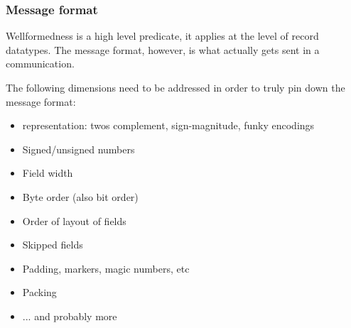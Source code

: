 \documentclass{beamer}
\begin{document}
\begin{frame}\frametitle{Message format}

Wellformedness is a high level predicate, it applies at the level of
record datatypes. The message format, however, is what actually gets
sent in a communication.

\vspace*{5mm}

The following dimensions need to be addressed in order to truly pin
down the message format:

\begin{itemize}
 \item representation: twos complement, sign-magnitude, funky encodings
 \item Signed/unsigned numbers
 \item Field width
 \item Byte order (also bit order)
 \item Order of layout of fields
 \item Skipped fields
 \item Padding, markers, magic numbers, etc
 \item Packing
 \item ... and probably more
\end{itemize}

\end{frame}
\end{document}
